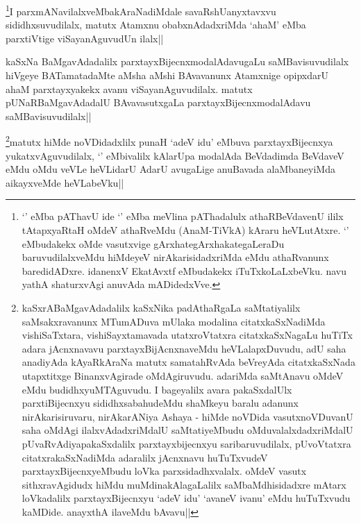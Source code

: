 

\begin{artha}
\footnote{`\stext' eMba pAThavU ide `\stext' eMba meVlina pAThadalulx athaRBeVdavenU ililx tAtapxyaRtaH oMdeV athaRveMdu (AnaM-TiVkA) kAraru heVLutAtxre. `\stext' eMbudakekx oMde vasutxvige gArxhategArxhakategaLeraDu baruvudilalxveMdu hiMdeyeV nirAkarisidadxriMda eMdu athaRvanunx baredidADxre. idanenxV EkatAvxtf eMbudakekx iTuTxkoLaLxbeVku. navu yathA shaturxvAgi anuvAda mADidedxVve.}I parxmANavilalxveMbakAraNadiMdale savaRshUanyxtavxvu sididhxsuvudilalx, matutx Atamxnu obabxnAdadxriMda `ahaM' eMba parxtiVtige viSayanAguvudUn ilalx||
\end{artha}

\begin{artha}
kaSxNa BaMgavAdadalilx parxtayxBijecnxmodalAdavugaLu saMBavisuvudilalx hiVgeye BATamatadaMte aMsha aMshi BAvavanunx Atamxnige opipxdarU ahaM parxtayxyakekx avanu viSayanAguvudilalx. matutx pUNaRBaMgavAdadalU BAvavasutxgaLa parxtayxBijecnxmodalAdavu saMBavisuvudilalx||
\end{artha}

\begin{artha}
\footnote{kaSxrABaMgavAdadalilx kaSxNika padAthaRgaLa saMtatiyalilx saMsakxravanunx MTumADuva mUlaka modalina citatxkaSxNadiMda vishiSaTxtara, vishiSayxtamavada utatxroVtatxra citatxkaSxNagaLu huTiTx adara jAcnxnavavu parxtayxBijAcnxnaveMdu heVLalapxDuvudu, adU saha anadiyAda kAyaRkAraNa matutx samatahRvAda beVreyAda citatxkaSxNada utapxtitxge BinanxvAgirade oMdAgiruvudu. adariMda saMtAnavu oMdeV eMdu budidhxyuMTAguvudu. I bageyalilx avara pakaSxdalUlx parxtiBijecnxyu sididhxsabahudeMdu shaMkeyu baralu adanunx nirAkarisiruvaru, nirAkarANiya Ashaya - hiMde noVDida vasutxnoVDuvanU saha oMdAgi ilalxvAdadxriMdalU saMtatiyeMbudu oMduvalalxdadxriMdalU pUvaRvAdiyapakaSxdalilx parxtayxbijecnxyu saribaruvudilalx, pUvoVtatxra citatxrakaSxNadiMda adaralilx jAcnxnavu huTuTxvudeV parxtayxBijecnxyeMbudu loVka parxsidadhxvalalx. oMdeV vasutx sithxravAgidudx hiMdu muMdinakAlagaLalilx saMbaMdhisidadxre mAtarx loVkadalilx parxtayxBijecnxyu `adeV idu'  `avaneV ivanu' eMdu huTuTxvudu kaMDide. anayxthA ilaveMdu bAvavu||}matutx hiMde noVDidadxlilx punaH `adeV idu' eMbuva parxtayxBijecnxya yukatxvAguvudilalx, `\stext' eMbivalilx kAlarUpa modalAda BeVdadimda BeVdaveV eMdu oMdu veVLe heVLidarU AdarU avugaLige anuBavada alaMbaneyiMda aikayxveMde heVLabeVku||
\end{artha}

